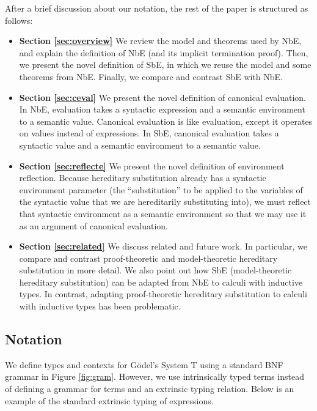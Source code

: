 \documentclass[runningheads,a4paper]{llncs}
\newcommand{\reffig}[1]{Figure \ref{fig:#1}}
\newcommand{\refsec}[1]{Section \ref{sec:#1}}
\begin{document}
After a brief discussion about our notation, the rest of the paper is
structured as follows:

\begin{itemize}
\item{\bf{\refsec{overview}}}
We review the model and theorems used by NbE, and explain the
definition of NbE (and its implicit termination proof). Then, we present the
novel definition of SbE, in which we reuse the model and some theorems
from NbE. Finally, we compare and contrast SbE with NbE.

\item{\bf{\refsec{ceval}}}
We present the novel definition of canonical evaluation. In NbE,
evaluation takes a syntactic expression and a semantic environment to
a semantic value. Canonical evaluation is like evaluation, except it
operates on values instead of expressions. In SbE, canonical evaluation
takes a syntactic value and a semantic environment to
a semantic value.

\item{\bf{\refsec{reflecte}}}
We present the novel definition of environment reflection. Because
hereditary substitution already has a syntactic environment parameter
(the ``substitution'' to be applied to the variables of the syntactic
value that we are hereditarily substituting into), we must reflect that
syntactic environment as a semantic environment so that we may use it
as an argument of canonical evaluation.

\item{\bf{\refsec{related}}}
We discuss related and future work. In particular, we compare and contrast
proof-theoretic and model-theoretic hereditary substitution in more
detail. We also point out how SbE (model-theoretic
hereditary substitution) can be adapted from NbE to calculi with
inductive types. In contrast, adapting proof-theoretic hereditary
substitution to calculi with inductive types has been problematic.
\end{itemize}

\subsection{Notation}

We define types and contexts for G{\"o}del's System T using a standard
BNF grammar in \reffig{gram}. However, we use intrinsically typed
terms instead of defining a grammar for terms and an extrinsic
typing relation. Below is an example of the standard extrinsic typing
of expressions.
\end{document}
